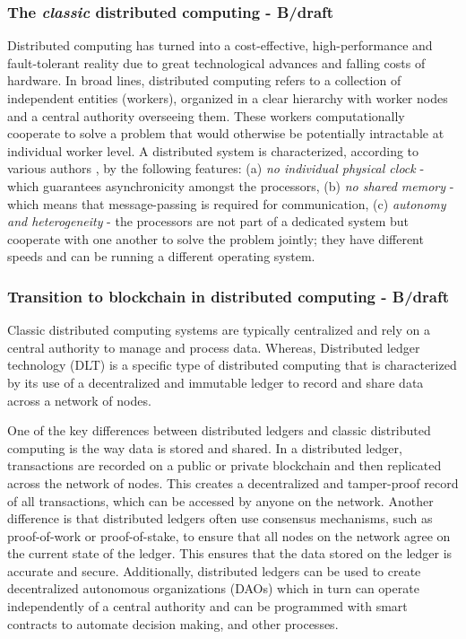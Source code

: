 \documentclass{article}
\begin{document}
\subsubsection{The \textit{classic} distributed computing - B/draft}
Distributed computing has turned into a cost-effective, high-performance and fault-tolerant reality due to great technological advances and falling costs of hardware. In broad lines, distributed computing refers to a collection of independent entities (workers), organized in a clear hierarchy with worker nodes and a central authority overseeing them. These workers computationally cooperate to solve a problem that would otherwise be potentially intractable at individual worker level. 
A distributed system is characterized, according to various authors \cite{ajay2008distributed}, by the following features: (a) \emph{no individual physical clock} - which guarantees asynchronicity amongst the processors, (b) \emph{no shared memory} - which means that message-passing is required for communication, (c) \emph{autonomy and heterogeneity} - the processors are not part of a dedicated system but cooperate with one another to solve the problem jointly; they have different speeds and can be running a different operating system.


\subsubsection{Transition to blockchain in distributed computing - B/draft}
Classic distributed computing systems are typically centralized and rely on a central authority to manage and process data. Whereas, Distributed ledger technology (DLT) \cite{burkhardt2018ledger}is a specific type of distributed computing that is characterized by its use of a decentralized and immutable ledger to record and share data across a network of nodes.

One of the key differences between distributed ledgers and classic distributed computing is the way data is stored and shared. In a distributed ledger, transactions are recorded on a public or private blockchain and then replicated across the network of nodes. This creates a decentralized and tamper-proof record of all transactions, which can be accessed by anyone on the network. Another difference is that distributed ledgers often use consensus mechanisms, such as proof-of-work or proof-of-stake, to ensure that all nodes on the network agree on the current state of the ledger. This ensures that the data stored on the ledger is accurate and secure. Additionally, distributed ledgers can be used to create decentralized autonomous organizations (DAOs)\cite{wang2019decentralized} which in turn can operate independently of a central authority and can be programmed with smart contracts to automate decision making, and other processes.
\end{document}
